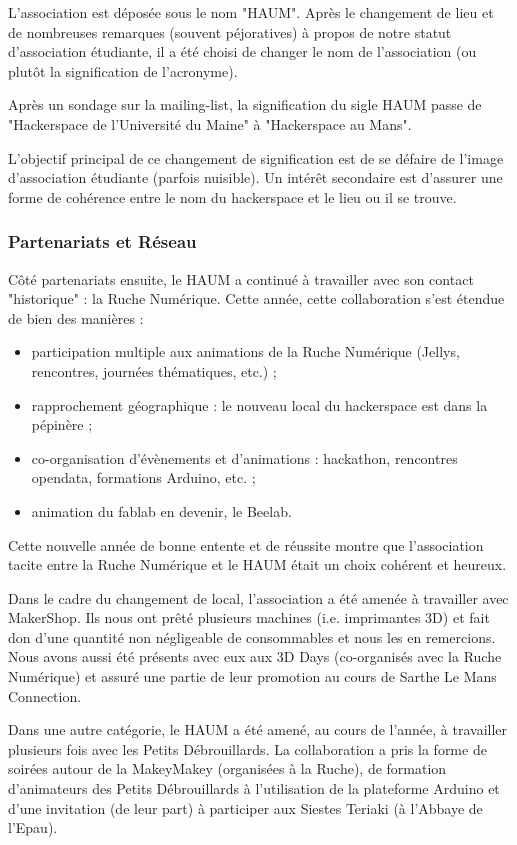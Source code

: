 \documentclass[11pt]{article}
\begin{document}
L'association est déposée sous le nom "HAUM". Après le changement de lieu et de nombreuses remarques (souvent péjoratives) à propos de notre statut d'association étudiante, il a été choisi de changer le nom de l'association (ou plutôt la signification de l'acronyme).

Après un sondage sur la mailing-list, la signification du sigle HAUM passe de "Hackerspace de l'Université du Maine" à "Hackerspace au Mans".

L'objectif principal de ce changement de signification est de se défaire de l'image d'association étudiante (parfois nuisible). Un intérêt secondaire est d'assurer une forme de cohérence entre le nom du hackerspace et le lieu ou il se trouve.

\subsubsection{Partenariats et Réseau}


Côté partenariats ensuite, le HAUM a continué à travailler avec son contact "historique" : la Ruche Numérique. Cette année, cette collaboration s'est étendue de bien des manières :

\begin{itemize}
    \item participation multiple aux animations de la Ruche Numérique (Jellys, rencontres, journées thématiques, etc.) ;
    \item rapprochement géographique : le nouveau local du hackerspace est dans la pépinère ;
    \item co-organisation d'évènements et d'animations : hackathon, rencontres opendata, formations Arduino, etc. ;
    \item animation du fablab en devenir, le Beelab.
\end{itemize}

Cette nouvelle année de bonne entente et de réussite montre que l'association tacite entre la Ruche Numérique et le HAUM était un choix cohérent et heureux.

Dans le cadre du changement de local, l'association a été amenée à travailler avec MakerShop. Ils nous ont prêté plusieurs machines (i.e. imprimantes 3D) et fait don d'une quantité non négligeable de consommables et nous les en remercions. Nous avons aussi été présents avec eux aux 3D Days (co-organisés avec la Ruche Numérique) et assuré une partie de leur promotion au cours de Sarthe Le Mans Connection.

Dans une autre catégorie, le HAUM a été amené, au cours de l'année, à travailler plusieurs fois avec les Petits Débrouillards. La collaboration a pris la forme de soirées autour de la MakeyMakey (organisées à la Ruche), de formation d'animateurs des Petits Débrouillards à l'utilisation de la plateforme Arduino et d'une invitation (de leur part) à participer aux Siestes Teriaki (à l'Abbaye de l'Epau).
\end{document}

